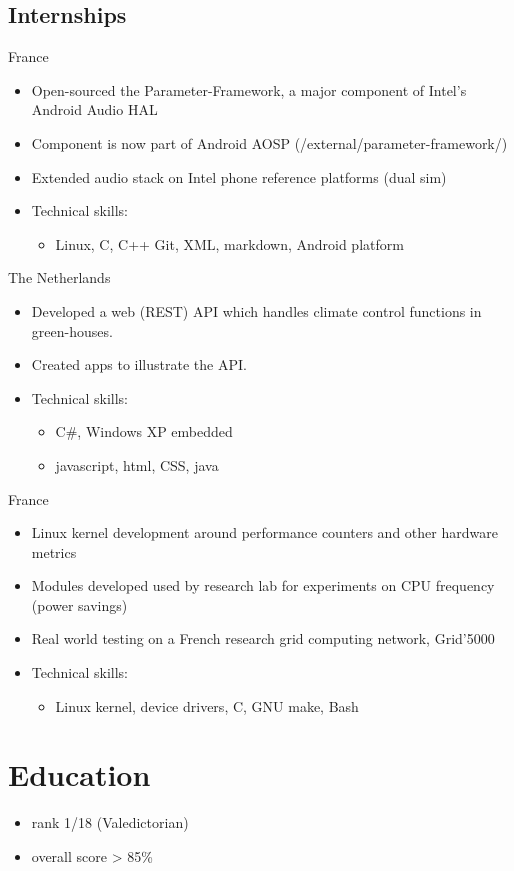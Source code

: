 \documentclass[a4paper,10pt,sans]{moderncv}
\begin{document}
\subsection{Internships}
{}{France}
{
  \begin{itemize}
    \item Open-sourced the Parameter-Framework, a major component of Intel's Android Audio HAL
    \item Component is now part of Android AOSP (/external/parameter-framework/)
    \item Extended audio stack on Intel phone reference platforms (dual sim)
    \item Technical skills:
    \begin{itemize}
      \item Linux, C, C++ Git, XML, markdown, Android platform
    \end{itemize}
  \end{itemize}
}

{}{The Netherlands}
{
  \begin{itemize}
    \item Developed a web (REST) API which handles climate control functions in green-houses.
    \item Created apps to illustrate the API.
    \item Technical skills:
    \begin{itemize}
      \item C\#, Windows XP embedded
      \item javascript, html, CSS, java
    \end{itemize}
  \end{itemize}
}

{}{France}
{
  \begin{itemize}
    \item Linux kernel development around performance counters and other hardware metrics
    \item Modules developed used by research lab for experiments on CPU frequency (power savings)
    \item Real world testing on a French research grid computing network, Grid'5000
    \item Technical skills:
      \begin{itemize}
        \item Linux kernel, device drivers, C, GNU make, Bash
      \end{itemize}
  \end{itemize}
}

\addvspace{5ex}

\section{Education}
{
  \begin{itemize}
  \item rank 1/18 (Valedictorian)
  \item overall score > 85\%
  \end{itemize}
}
\end{document}
